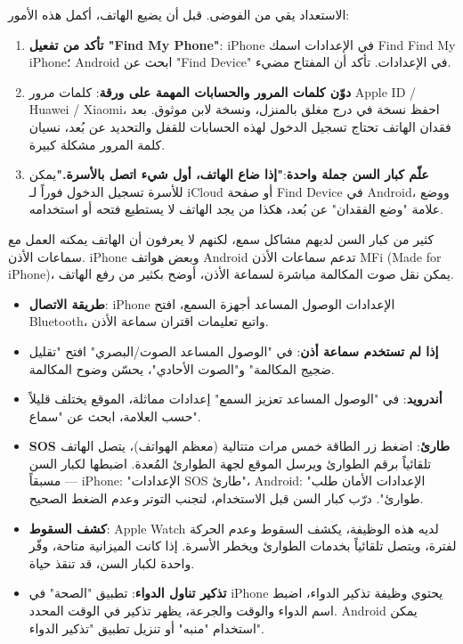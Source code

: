 
الاستعداد يقي من الفوضى. قبل أن يضيع الهاتف، أكمل هذه الأمور:

\begin{enumerate}
  \item \textbf{تأكد من تفعيل "Find My Phone"}: iPhone في الإعدادات اسمك Find Find My iPhone؛ Android ابحث عن "Find Device" في الإعدادات. تأكد أن المفتاح مضيء.
  \item \textbf{دوّن كلمات المرور والحسابات المهمة على ورقة}: كلمات مرور Apple ID / Huawei / Xiaomi، احفظ نسخة في درج مغلق بالمنزل، ونسخة لابن موثوق. بعد فقدان الهاتف تحتاج تسجيل الدخول لهذه الحسابات للقفل والتحديد عن بُعد، نسيان كلمة المرور مشكلة كبيرة.
  \item \textbf{علّم كبار السن جملة واحدة}:\textbf{"إذا ضاع الهاتف، أول شيء اتصل بالأسرة."}يمكن للأسرة تسجيل الدخول فوراً لـ iCloud أو صفحة Find Device في Android، ووضع علامة "وضع الفقدان" عن بُعد، هكذا من يجد الهاتف لا يستطيع فتحه أو استخدامه.
\end{enumerate}


كثير من كبار السن لديهم مشاكل سمع، لكنهم لا يعرفون أن الهاتف يمكنه العمل مع سماعات الأذن. iPhone وبعض هواتف Android تدعم سماعات الأذن MFi (Made for iPhone)، يمكن نقل صوت المكالمة مباشرة لسماعة الأذن، أوضح بكثير من رفع الهاتف.

\begin{itemize}
  \item \textbf{طريقة الاتصال}: iPhone الإعدادات الوصول المساعد أجهزة السمع، افتح Bluetooth، واتبع تعليمات اقتران سماعة الأذن.
  \item \textbf{إذا لم تستخدم سماعة أذن}: في "الوصول المساعد الصوت/البصري" افتح "تقليل ضجيج المكالمة" و"الصوت الأحادي"، يحسّن وضوح المكالمة.
  \item \textbf{أندرويد}: في "الوصول المساعد تعزيز السمع" إعدادات مماثلة، الموقع يختلف قليلاً حسب العلامة، ابحث عن "سماع".
\end{itemize}


\begin{itemize}
  \item \textbf{SOS طارئ}: اضغط زر الطاقة خمس مرات متتالية (معظم الهواتف)، يتصل الهاتف تلقائياً برقم الطوارئ ويرسل الموقع لجهة الطوارئ المُعدة. اضبطها لكبار السن مسبقاً — iPhone: "الإعدادات SOS طارئ"، Android: "الإعدادات الأمان طلب طوارئ". درّب كبار السن قبل الاستخدام، لتجنب التوتر وعدم الضغط الصحيح.
  \item \textbf{كشف السقوط}: Apple Watch لديه هذه الوظيفة، يكشف السقوط وعدم الحركة لفترة، ويتصل تلقائياً بخدمات الطوارئ ويخطر الأسرة. إذا كانت الميزانية متاحة، وفّر واحدة لكبار السن، قد تنقذ حياة.
  \item \textbf{تذكير تناول الدواء}: تطبيق "الصحة" في iPhone يحتوي وظيفة تذكير الدواء، اضبط اسم الدواء والوقت والجرعة، يظهر تذكير في الوقت المحدد. Android يمكن استخدام "منبه" أو تنزيل تطبيق "تذكير الدواء".
\end{itemize}

